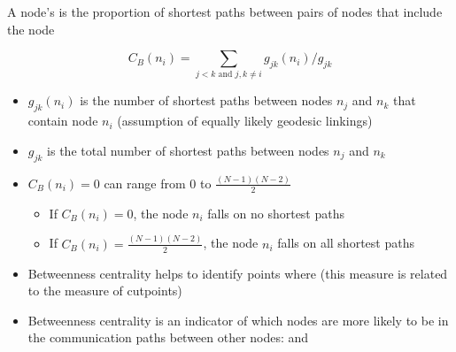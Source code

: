 \documentclass[8pt]{beamer}
\begin{document}
\begin{frame}
\frametitle{\insertsection}
\framesubtitle{\insertsubsection}


A node's {\color{blue}{betweenness centrality}} is the proportion of shortest paths between pairs of nodes that include the node

\centering
\begin{equation*}
C_B(n_i) = \sum_{j<k \text{ and } j,k \neq i}g_{jk}(n_i)/g_{jk}
\end{equation*}

\begin{itemize}
\item $g_{jk}(n_i)$ is the  number of shortest paths between nodes $n_j$ and $n_k$ that contain node $n_i$ (assumption of equally likely geodesic linkings)
\item $g_{jk}$ is the total number of shortest paths between nodes $n_j$ and $n_k$
\item $C_B(n_i)=0$ can range from $0$ to $\frac{(N-1)(N-2)}{2}$
	\begin{itemize}
	\item If $C_B(n_i)=0$, the node $n_i$ falls on no shortest paths
	\item If $C_B(n_i)=\frac{(N-1)(N-2)}{2}$, the node $n_i$ falls on all shortest paths
	\end{itemize}
\item Betweenness centrality helps to identify points where {\color{blue}{the network is likely break apart}} (this measure is related to the measure of cutpoints)
\item Betweenness centrality is an indicator of which nodes are more likely to be in the communication paths between other nodes: {\color{blue}{control}} and {\color{blue}{power}}

\end{itemize}

\end{frame}
\end{document}
